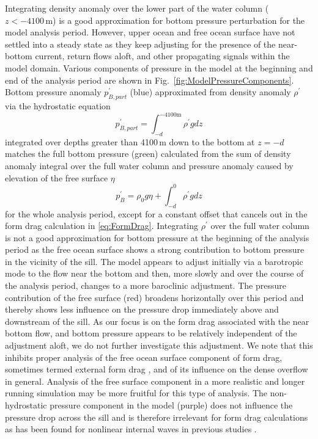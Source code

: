 \documentclass{ametsocV6.1}
\begin{document}
Integrating density anomaly over the lower part of the water column ($z<-4100\,\mathrm{m}$) is a good approximation for bottom pressure perturbation for the model analysis period.
However, upper ocean and free ocean surface have not settled into a steady state as they keep adjusting for the presence of the near-bottom current, return flows aloft, and other propagating signals within the model domain.
Various components of pressure in the model at the beginning and end of the analysis period are shown in Fig.~\ref{fig:ModelPressureComponents}.
Bottom pressure anomaly $p_{B, part}^\prime$ (blue) approximated from density anomaly $\rho^\prime$ via the hydrostatic equation
\begin{equation}
    p_{B, part}^\prime = \int_{-d}^{-4100\mathrm{m}} \rho^\prime g dz
\end{equation}
integrated over depths greater than 4100\,m down to the bottom at $z=-d$ matches the full bottom pressure (green) calculated from the sum of density anomaly integral over the full water column and pressure anomaly caused by elevation of the free surface $\eta$
\begin{equation}
    p_B^\prime = \rho_0 g \eta + \int_{-d}^{0} \rho^\prime g dz
\end{equation}
for the whole analysis period, except for a constant offset that cancels out in the form drag calculation in \eqref{eq:FormDrag}.
Integrating $\rho^\prime$ over the full water column is not a good approximation for bottom pressure at the beginning of the analysis period as the free ocean surface shows a strong contribution to bottom pressure in the vicinity of the sill.
The model appears to adjust initially via a barotropic mode to the flow near the bottom and then, more slowly and over the course of the analysis period, changes to a more baroclinic adjustment.
The pressure contribution of the free surface (red) broadens horizontally over this period and thereby shows less influence on the pressure drop immediately above and downstream of the sill.
As our focus is on the form drag associated with the near bottom flow, and bottom pressure appears to be relatively independent of the adjustment aloft, we do not further investigate this adjustment.
We note that this inhibits proper analysis of the free ocean surface component of form drag, sometimes termed external form drag \citep[e.g.][]{warneretal13}, and of its influence on the dense overflow in general.
Analysis of the free surface component in a more realistic and longer running simulation may be more fruitful for this type of analysis.
The non-hydrostatic pressure component in the model (purple) does not influence the pressure drop across the sill and is therefore irrelevant for form drag calculations as has been found for nonlinear internal waves in previous studies \citep{warneretal13, moumsmyth06}.
\end{document}
